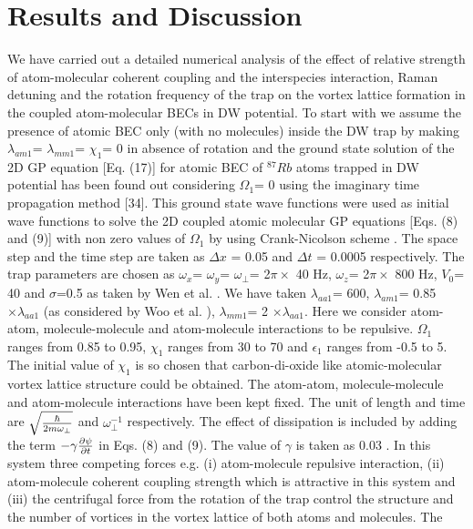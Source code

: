 \documentclass[10pt,a4paper]{article}
\begin{document}
\section{Results and Discussion}

We have carried out a detailed numerical analysis of the effect of
relative strength of atom-molecular coherent coupling and the
interspecies interaction, Raman detuning and the rotation
frequency of the trap on the vortex lattice formation in the
coupled atom-molecular BECs in DW potential. To start with we
assume the presence of atomic BEC only (with no molecules) inside
the DW trap by making $\lambda_{am1}$= $\lambda_{mm1}$= $\chi_1$=
0 in absence of rotation and the ground state solution of the 2D
GP equation [Eq. (17)] for atomic BEC of $^{87}Rb$ atoms trapped
in DW potential has been found out considering $\Omega_1$= 0 using
the imaginary time propagation method [34]. This ground state wave
functions were used as initial wave functions to solve the 2D
coupled atomic molecular GP equations [Eqs. (8) and (9)] with non
zero values of $\Omega_1$ by using Crank-Nicolson scheme \cite{M3,
M4}. The space step and the time step are taken as $\Delta x$ =
0.05 and $\Delta t$ = 0.0005 respectively. The trap parameters are
chosen as $\omega_x$= $\omega_y$= $\omega_\perp$= 2$\pi \times$ 40
Hz, $\omega_z$= 2$\pi \times$ 800 Hz, $V_0$= 40 and $\sigma$=0.5 as taken by Wen et al. \cite{Wen_1}.
We have taken $\lambda_{aa1}$= 600, $\lambda_{am1}$= 0.85 $\times
\lambda_{aa1}$ (as considered by Woo et al. \cite{Woo}), $\lambda_{mm1}$= 2 $\times \lambda_{aa1}$. Here we
consider atom-atom, molecule-molecule and atom-molecule
interactions to be repulsive. $\Omega_1$ ranges from 0.85 to 0.95,
$\chi_1$ ranges from 30 to 70 and $\epsilon_1$ ranges from -0.5 to 5.
The initial value of $\chi_1$ is so chosen that carbon-di-oxide
like atomic-molecular vortex lattice structure could be obtained.
The atom-atom, molecule-molecule and atom-molecule interactions
have been kept fixed. The unit of length and time are
$\sqrt{\hbar\over {2m\omega_\perp}}$ and $\omega_\perp^{-1}$
respectively. The effect of dissipation is included by adding the
term $-\gamma {\partial \psi \over \partial t}$ in Eqs. (8) and
(9). The value of $\gamma$ is taken as 0.03 \cite{Wen_1}. In this
system three competing forces e.g. (i) atom-molecule repulsive
interaction, (ii) atom-molecule coherent coupling strength which
is attractive in this system and (iii) the centrifugal force from
the rotation of the trap control the structure and the number of
vortices in the vortex lattice of both atoms and molecules. The
\end{document}
